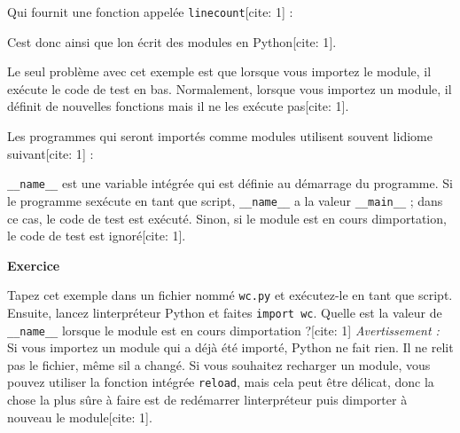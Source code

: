 Qui fournit une fonction appelée \texttt{linecount}{[}cite: 1{]} :

\begin{Shaded}
\begin{Highlighting}[]
\OperatorTok{\textgreater{}\textgreater{}\textgreater{}}\NormalTok{)}
\end{Highlighting}
\end{Shaded}

C\textquotesingle est donc ainsi que l\textquotesingle on écrit des
modules en Python{[}cite: 1{]}.

Le seul problème avec cet exemple est que lorsque vous importez le
module, il exécute le code de test en bas. Normalement, lorsque vous
importez un module, il définit de nouvelles fonctions mais il ne les
exécute pas{[}cite: 1{]}.

Les programmes qui seront importés comme modules utilisent souvent
l\textquotesingle idiome suivant{[}cite: 1{]} :

\begin{Shaded}
\begin{Highlighting}[]
  \OperatorTok{==} \NormalTok{:}
    \NormalTok{)}
\end{Highlighting}
\end{Shaded}

\texttt{\_\_name\_\_} est une variable intégrée qui est définie au
démarrage du programme. Si le programme s\textquotesingle exécute en
tant que script, \texttt{\_\_name\_\_} a la valeur \texttt{\_\_main\_\_}
; dans ce cas, le code de test est exécuté. Sinon, si le module est en
cours d\textquotesingle importation, le code de test est ignoré{[}cite:
1{]}.

\textbf{Exercice}

Tapez cet exemple dans un fichier nommé \texttt{wc.py} et exécutez-le en
tant que script. Ensuite, lancez l\textquotesingle interpréteur Python
et faites \texttt{import\ wc}. Quelle est la valeur de
\texttt{\_\_name\_\_} lorsque le module est en cours
d\textquotesingle importation ?{[}cite: 1{]} \emph{Avertissement :} Si
vous importez un module qui a déjà été importé, Python ne fait rien. Il
ne relit pas le fichier, même s\textquotesingle il a changé. Si vous
souhaitez recharger un module, vous pouvez utiliser la fonction intégrée
\texttt{reload}, mais cela peut être délicat, donc la chose la plus sûre
à faire est de redémarrer l\textquotesingle interpréteur puis
d\textquotesingle importer à nouveau le module{[}cite: 1{]}.


